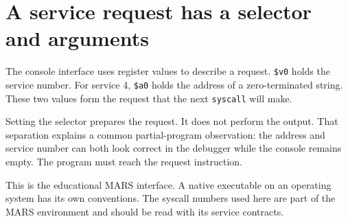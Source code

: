 \section{A service request has a selector and
  arguments}\label{001-console-calculation-p05-a-service-request-has-a-selector-and-arguments}

The console interface uses register values to describe a request.
\texttt{\$v0} holds the service number. For service 4, \texttt{\$a0}
holds the address of a zero-terminated string. These two values form the
request that the next \texttt{syscall} will make.

Setting the selector prepares the request. It does not perform the
output. That separation explains a common partial-program observation:
the address and service number can both look correct in the debugger
while the console remains empty. The program must reach the request
instruction.

This is the educational MARS interface. A native executable on an
operating system has its own conventions. The syscall numbers used here
are part of the MARS environment and should be read with its service
contracts.
